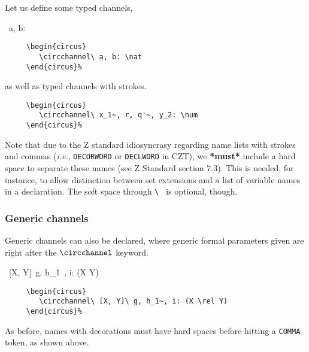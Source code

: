 \documentclass{article}
\newcommand{\grammar}[1]{\texttt{#1}}
\begin{document}
Let us define some typed channels,
%
\begin{circus}
  \circchannel\ a, b: \nat
\end{circus}%
%
\begin{verbatim}
     \begin{circus}
        \circchannel\ a, b: \nat
     \end{circus}%
\end{verbatim}
%
as well as typed channels with strokes.
%
%
%
\begin{verbatim}
     \begin{circus}
        \circchannel\ x_1~, r, q'~, y_2: \num
     \end{circus}%
\end{verbatim}
%
Note that due to the Z standard idiosyncrasy regarding name lists with strokes
and commas (\textit{i.e.}, \grammar{DECORWORD} or \grammar{DECLWORD} in CZT),
we \textbf{*must*} include a hard space to separate these names (see Z Standard
section 7.3). This is needed, for instance, to allow distinction between set
extensions and a list of variable names in a declaration. The soft space
through \verb'\ ' is optional, though.

\subsubsection{Generic channels}

Generic channels can also be declared, where generic formal parameters given
are right after the $\circchannel$ keyword.
%
\begin{circus}
   \circchannel\ [X, Y]\ g, h_1~, i: (X \rel Y)
\end{circus}%
%
\begin{verbatim}
     \begin{circus}
        \circchannel\ [X, Y]\ g, h_1~, i: (X \rel Y)
     \end{circus}%
\end{verbatim}
%
As before, names with decorations must have hard spaces before hitting a
\texttt{COMMA} token, as shown above.
\end{document}
